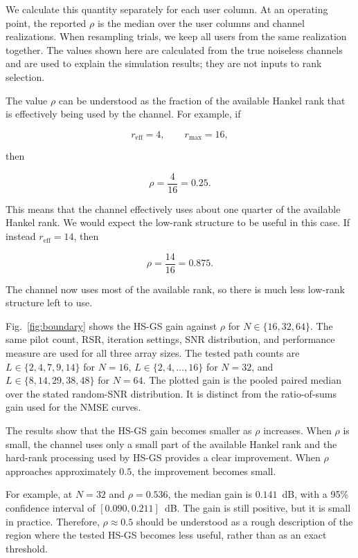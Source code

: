 \documentclass[journal]{IEEEtran}
\begin{document}
We calculate this quantity separately for each user column. At an
operating point, the reported $\rho$ is the median over the user columns
and channel realizations. When resampling trials, we keep all users from
the same realization together. The values shown here are calculated from
the true noiseless channels and are used to explain the simulation results;
they are not inputs to rank selection.

The value $\rho$ can be understood as the fraction of the available Hankel
rank that is effectively being used by the channel. For example, if

\begin{equation}
r_{\mathrm{eff}}=4,
\qquad
r_{\max}=16,
\end{equation}

then

\begin{equation}
\rho
=
\frac{4}{16}
=
0.25.
\end{equation}

This means that the channel effectively uses about one quarter of the
available Hankel rank. We would expect the low-rank structure to be useful
in this case. If instead $r_{\mathrm{eff}}=14$, then

\begin{equation}
\rho
=
\frac{14}{16}
=
0.875.
\end{equation}

The channel now uses most of the available rank, so there is much less
low-rank structure left to use.

Fig.~\ref{fig:boundary} shows the HS-GS gain against $\rho$ for
$N\in\{16,32,64\}$. The same pilot count, RSR, iteration settings, SNR
distribution, and performance measure are used for all three array sizes.
The tested path counts are $L\in\{2,4,7,9,14\}$ for $N=16$,
$L\in\{2,4,\ldots,16\}$ for $N=32$, and
$L\in\{8,14,29,38,48\}$ for $N=64$. The plotted gain is the pooled
paired median over the stated random-SNR distribution. It is distinct
from the ratio-of-sums gain used for the NMSE curves.

The results show that the HS-GS gain becomes smaller as $\rho$ increases.
When $\rho$ is small, the channel uses only a small part of the available
Hankel rank and the hard-rank processing used by HS-GS provides a clear improvement. When
$\rho$ approaches approximately $0.5$, the improvement becomes small.

For example, at $N=32$ and $\rho=0.536$, the median gain is
$0.141$~dB, with a 95\% confidence interval of
$[0.090,0.211]$~dB. The gain is still positive, but it is small in
practice. Therefore, $\rho\approx0.5$ should be understood as a rough
description of the region where the tested HS-GS becomes less useful,
rather than as an exact threshold.
\end{document}
